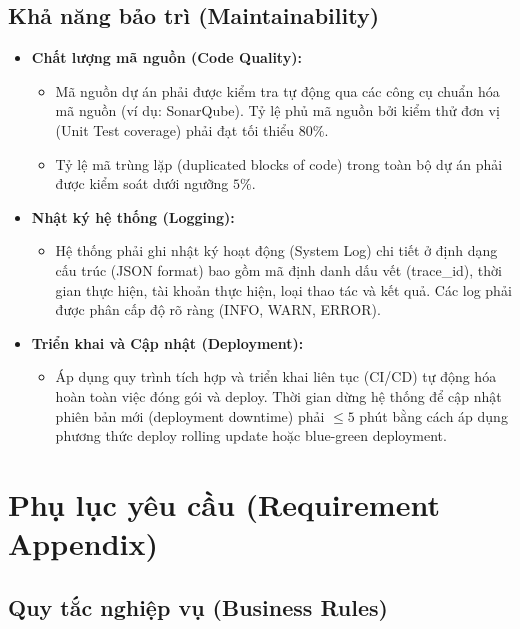 \subsection{Khả năng bảo trì (Maintainability)}
\label{subsec:nfr_maintainability}
\begin{itemize}
    \item \textbf{Chất lượng mã nguồn (Code Quality):}
    \begin{itemize}
        \item Mã nguồn dự án phải được kiểm tra tự động qua các công cụ chuẩn hóa mã nguồn (ví dụ: SonarQube). Tỷ lệ phủ mã nguồn bởi kiểm thử đơn vị (Unit Test coverage) phải đạt tối thiểu $80\%$.
        \item Tỷ lệ mã trùng lặp (duplicated blocks of code) trong toàn bộ dự án phải được kiểm soát dưới ngưỡng $5\%$.
    \end{itemize}
    \item \textbf{Nhật ký hệ thống (Logging):}
    \begin{itemize}
        \item Hệ thống phải ghi nhật ký hoạt động (System Log) chi tiết ở định dạng cấu trúc (JSON format) bao gồm mã định danh dấu vết (trace\_id), thời gian thực hiện, tài khoản thực hiện, loại thao tác và kết quả. Các log phải được phân cấp độ rõ ràng (INFO, WARN, ERROR).
    \end{itemize}
    \item \textbf{Triển khai và Cập nhật (Deployment):}
    \begin{itemize}
        \item Áp dụng quy trình tích hợp và triển khai liên tục (CI/CD) tự động hóa hoàn toàn việc đóng gói và deploy. Thời gian dừng hệ thống để cập nhật phiên bản mới (deployment downtime) phải $\le 5$ phút bằng cách áp dụng phương thức deploy rolling update hoặc blue-green deployment.
    \end{itemize}
\end{itemize}

\section{Phụ lục yêu cầu (Requirement Appendix)}
\label{sec:srs_appendix}

\subsection{Quy tắc nghiệp vụ (Business Rules)}
\label{subsec:srs_business_rules}

